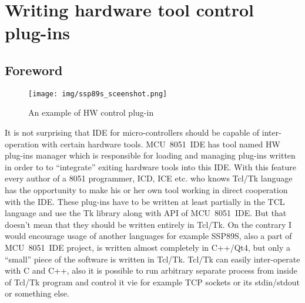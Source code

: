 \documentclass[a4paper,twoside,12pt]{book}
\begin{document}
\chapter{Writing hardware tool control plug-ins}
	\label{sec:WritingHardwareToolControlPlugIns}
	\section{Foreword}
		\begin{wrapfigure}{r}{120pt}
			\centering{}
			\texttt{[image: img/ssp89s\_sceenshot.png]}
			\caption{An example of HW control plug-in}
		\end{wrapfigure}
		It is not surprising that IDE for micro-controllers should be capable of inter-operation with certain hardware tools. MCU~8051~IDE has tool named HW plug-ins manager which is responsible for loading and managing plug-ins written in order to to ``integrate'' exiting hardware tools into this IDE. With this feature every author of a 8051 programmer, ICD, ICE etc. who knows Tcl/Tk language has the opportunity to make his or her own tool working in direct cooperation with the IDE. These plug-ins have to be written at least partially in the TCL language and use the Tk library along with API of MCU~8051~IDE. But that doesn't mean that they should be written entirely in Tcl/Tk. On the contrary I would encourage usage of another languages for example SSP89S, also a part of MCU~8051~IDE project, is written almost completely in C++/Qt4, but only a ``small'' piece of the software is written in Tcl/Tk. Tcl/Tk can easily inter-operate with C and C++, also it is possible to run arbitrary separate process from inside of Tcl/Tk program and control it vie for example TCP sockets or its stdin/stdout or something else.
\end{document}
